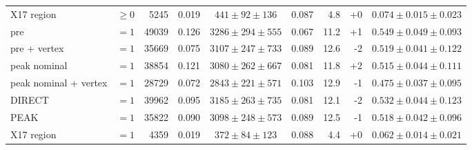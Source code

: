 \begin{table}[H]
\begin{tabular}{llrrcrrrc}
X17 region & $\geq0$ & 5245 & 0.019 & $441\pm92\pm136$ & 0.087 & 4.8 & +0 & $0.074\pm0.015\pm0.023$ \\
\addlinespace
pre & $=1$ & 49039 & 0.126 & $3286\pm294\pm555$ & 0.067 & 11.2 & +1 & $0.549\pm0.049\pm0.093$ \\
pre + vertex & $=1$ & 35669 & 0.075 & $3107\pm247\pm733$ & 0.089 & 12.6 & -2 & $0.519\pm0.041\pm0.122$ \\
peak nominal & $=1$ & 38854 & 0.121 & $3080\pm262\pm667$ & 0.081 & 11.8 & +2 & $0.515\pm0.044\pm0.111$ \\
peak nominal + vertex & $=1$ & 28729 & 0.072 & $2843\pm221\pm571$ & 0.103 & 12.9 & -1 & $0.475\pm0.037\pm0.095$ \\
DIRECT & $=1$ & 39962 & 0.095 & $3185\pm263\pm735$ & 0.081 & 12.1 & -2 & $0.532\pm0.044\pm0.123$ \\
PEAK & $=1$ & 35822 & 0.090 & $3098\pm248\pm573$ & 0.089 & 12.5 & -1 & $0.518\pm0.042\pm0.096$ \\
X17 region & $=1$ & 4359 & 0.019 & $372\pm84\pm123$ & 0.088 & 4.4 & +0 & $0.062\pm0.014\pm0.021$ \\
\bottomrule
\end{tabular}
\end{table}
